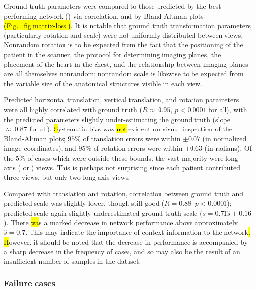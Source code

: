 Ground truth parameters were compared to those predicted by the best performing network (\bestnetwork{}) via correlation, and by Bland Altman plots \hl{(Fig.~\ref{fig:matrix-loss})}.
It is notable that ground truth transformation parameters (particularly rotation and scale) were not uniformly distributed between views.
Nonrandom rotation is to be expected from the fact that the positioning of the patient in the scanner, the protocol for determining imaging planes, the placement of the heart in the chest, and the relationship between imaging planes are all themselves nonrandom; nonrandom scale is likewise to be expected from the variable size of the anatomical structures visible in each view.

Predicted horizontal translation, vertical translation, and rotation parameters were all highly correlated with ground truth ($R \approx~0.95$, $p < 0.0001$ for all), with the predicted parameters slightly under-estimating the ground truth (slope $\approx~0.87$ for all).  \hl{S}ystematic bias was \hl{not} evident on visual inspection of the Bland-Altman plots; $95\%$ of translation errors were within $\pm 0.07$ (in normalized image coordinates), and $95\%$ of rotation errors were within $\pm 0.63$ (in radians).
Of the $5\%$ of cases which were outside these bounds, the vast majority were long axis (\HLA{} or \VLA{}) views.
This is perhaps not surprising since each patient contributed three \SA{} views, but only two long axis views.

Compared with translation and rotation, correlation between ground truth and predicted scale was slightly lower, though still good ($R = 0.88$, $p < 0.0001$); predicted scale again slightly underestimated ground truth scale ($s = 0.71\hat{s} + 0.16$).
There \hl{wa}s a marked decrease in network performance above approximately $\hat{s} = 0.7$.
This may indicate the importance of context information to the network\hl{.
H}owever, it should be noted that the decrease in performance is accompanied by a sharp decrease in the frequency of cases, and so may also be the result of an insufficient number of samples in the dataset.


\subsubsection{Failure cases}



